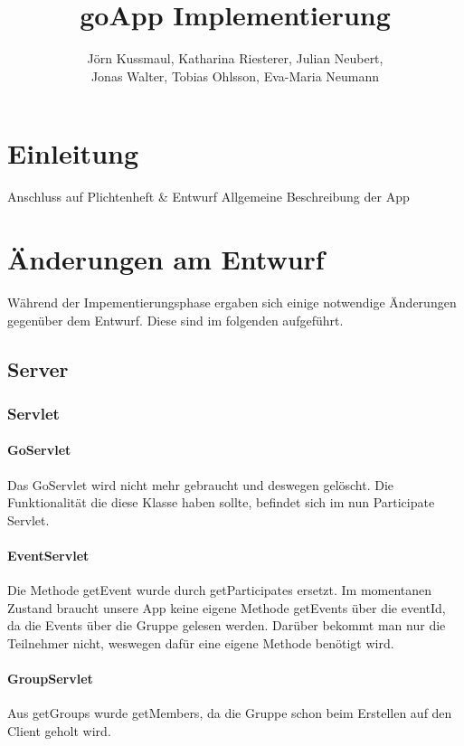 \documentclass{scrartcl}
\title{goApp Implementierung}
\author{Jörn Kussmaul, Katharina Riesterer, Julian Neubert,\\ Jonas Walter, Tobias Ohlsson, Eva-Maria Neumann}
\begin{document}
	\maketitle
	\newpage
	\tableofcontents
	\newpage

	\section{Einleitung}%
	Anschluss auf Plichtenheft \& Entwurf
	Allgemeine Beschreibung der App
	
	\newpage
	\section{Änderungen am Entwurf}
	Während der Impementierungsphase ergaben sich einige notwendige Änderungen gegenüber dem Entwurf. Diese sind im folgenden aufgeführt.
	
	\subsection{Server}
	\subsubsection{Servlet}
	\paragraph{GoServlet}
	Das GoServlet wird nicht mehr gebraucht und deswegen gelöscht. Die Funktionalität die diese Klasse haben sollte, befindet sich im nun Participate Servlet.
	
	
	\paragraph{EventServlet}
	Die Methode getEvent wurde durch getParticipates ersetzt. Im momentanen Zustand braucht unsere App keine eigene Methode getEvents über die eventId, da die Events über die Gruppe gelesen werden. 
	Darüber bekommt man nur die Teilnehmer nicht, weswegen dafür eine eigene Methode benötigt wird.
	
	\paragraph{GroupServlet}
	Aus getGroups wurde getMembers, da die Gruppe schon beim Erstellen auf den Client geholt wird. 	%
	
\end{document}
